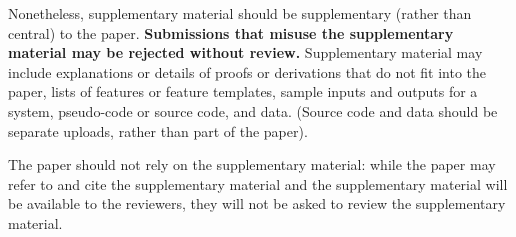 \documentclass[11pt,a4paper]{article}
\begin{document}
Nonetheless, supplementary material should be supplementary (rather than central) to the paper.
\textbf{Submissions that misuse the supplementary material may be rejected without review.}
Supplementary material may include explanations or details of proofs or derivations that do not fit into the paper, lists of
features or feature templates, sample inputs and outputs for a system, pseudo-code or source code, and data.
(Source code and data should be separate uploads, rather than part of the paper).

The paper should not rely on the supplementary material: while the paper may refer to and cite the supplementary material and the supplementary material will be available to the reviewers, they will not be asked to review the supplementary material.
\end{document}
